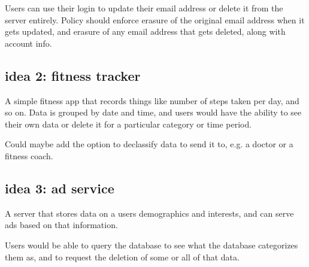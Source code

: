 \documentclass[11pt, oneside]{article}   	%
\begin{document}
Users can use their login to update their email address or delete it from the server entirely. Policy should enforce erasure of the original email address when it gets updated, and erasure of any email address that gets deleted, along with account info.

\subsection{idea 2: fitness tracker}
A simple fitness app that records things like number of steps taken per day, and so on. Data is grouped by date and time, and users would have the ability to see their own data or delete it for a particular category or time period.

Could maybe add the option to declassify data to send it to, e.g. a doctor or a fitness coach.

\subsection{idea 3: ad service}
A server that stores data on a users demographics and interests, and can serve ads based on that information.

Users would be able to query the database to see what the database categorizes them as, and to request the deletion of some or all of that data.
\end{document}
